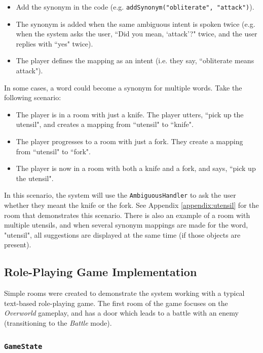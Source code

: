 \documentclass[11pt]{article}
\begin{document}
\begin{itemize}
\item Add the synonym in the code (e.g. \texttt{addSynonym("obliterate", "attack")}).

\item The synonym is added when the same ambiguous intent is spoken twice (e.g. when the system asks the user, ``Did you mean, `attack'?" twice, and the user replies with ``yes" twice).

\item The player defines the mapping as an intent (i.e. they say, ``obliterate means attack").
\end{itemize}

In some cases, a word could become a synonym for multiple words. Take the following scenario:

\begin{itemize}
\item The player is in a room with just a knife. The player utters, ``pick up the utensil", and creates a mapping from ``utensil" to ``knife".

\item The player progresses to a room with just a fork. They create a mapping from ``utensil" to ``fork".

\item The player is now in a room with both a knife and a fork, and says, ``pick up the utensil".
\end{itemize}

In this scenario, the system will use the \texttt{AmbiguousHandler} to ask the user whether they meant the knife or the fork. See Appendix \ref{appendix:utensil} for the room that demonstrates this scenario. There is also an example of a room with multiple utensils, and when several synonym mappings are made for the word, "utensil", all suggestions are displayed at the same time (if those objects are present).

\subsection{Role-Playing Game Implementation}

Simple rooms were created to demonstrate the system working with a typical text-based role-playing game. The first room of the game focuses on the \textit{Overworld} gameplay, and has a door which leads to a battle with an enemy (transitioning to the \textit{Battle} mode).

\subsubsection{\texttt{GameState}}
\end{document}
